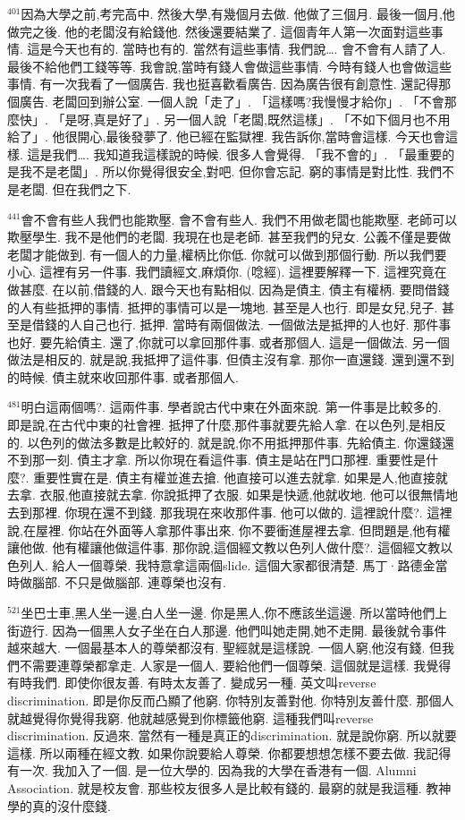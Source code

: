 \documentclass{book}
\begin{document}
$^{401}$因為大學之前,考完高中.
然後大學,有幾個月去做.
他做了三個月.
最後一個月,他做完之後.
他的老闆沒有給錢他.
然後還要結業了.
這個青年人第一次面對這些事情.
這是今天也有的.
當時也有的.
當然有這些事情.
我們說….
會不會有人請了人.
最後不給他們工錢等等.
我會說,當時有錢人會做這些事情.
今時有錢人也會做這些事情.
有一次我看了一個廣告.
我也挺喜歡看廣告.
因為廣告很有創意性.
還記得那個廣告.
老闆回到辦公室.
一個人說「走了」.
「這樣嗎?我慢慢才給你」.
「不會那麼快」.
「是呀,真是好了」.
另一個人說「老闆,既然這樣」.
「不如下個月也不用給了」.
他很開心,最後發夢了.
他已經在監獄裡.
我告訴你,當時會這樣.
今天也會這樣.
這是我們….
我知道我這樣說的時候.
很多人會覺得.
「我不會的」.
「最重要的是我不是老闆」.
所以你覺得很安全,對吧.
但你會忘記.
窮的事情是對比性.
我們不是老闆.
但在我們之下.

$^{441}$會不會有些人我們也能欺壓.
會不會有些人.
我們不用做老闆也能欺壓.
老師可以欺壓學生.
我不是他們的老闆.
我現在也是老師.
甚至我們的兒女.
公義不僅是要做老闆才能做到.
有一個人的力量,權柄比你低.
你就可以做到那個行動.
所以我們要小心.
這裡有另一件事.
我們讀經文,麻煩你.
(唸經).
這裡要解釋一下.
這裡究竟在做甚麼.
在以前,借錢的人.
跟今天也有點相似.
因為是債主.
債主有權柄.
要問借錢的人有些抵押的事情.
抵押的事情可以是一塊地.
甚至是人也行.
即是女兒,兒子.
甚至是借錢的人自己也行.
抵押.
當時有兩個做法.
一個做法是抵押的人也好.
那件事也好.
要先給債主.
還了,你就可以拿回那件事.
或者那個人.
這是一個做法.
另一個做法是相反的.
就是說,我抵押了這件事.
但債主沒有拿.
那你一直還錢.
還到還不到的時候.
債主就來收回那件事.
或者那個人.

$^{481}$明白這兩個嗎?.
這兩件事.
學者說古代中東在外面來說.
第一件事是比較多的.
即是說,在古代中東的社會裡.
抵押了什麼,那件事就要先給人拿.
在以色列,是相反的.
以色列的做法多數是比較好的.
就是說,你不用抵押那件事.
先給債主.
你還錢還不到那一刻.
債主才拿.
所以你現在看這件事.
債主是站在門口那裡.
重要性是什麼?.
重要性實在是.
債主有權並進去搶.
他直接可以進去就拿.
如果是人,他直接就去拿.
衣服,他直接就去拿.
你說抵押了衣服.
如果是快遞,他就收地.
他可以很無情地去到那裡.
你現在還不到錢.
那我現在來收那件事.
他可以做的.
這裡說什麼?.
這裡說,在屋裡.
你站在外面等人拿那件事出來.
你不要衝進屋裡去拿.
但問題是,他有權讓他做.
他有權讓他做這件事.
那你說,這個經文教以色列人做什麼?.
這個經文教以色列人.
給人一個尊榮.
我特意拿這兩個slide.
這個大家都很清楚.
馬丁·路德金當時做腦部.
不只是做腦部.
連尊榮也沒有.

$^{521}$坐巴士車,黑人坐一邊,白人坐一邊.
你是黑人,你不應該坐這邊.
所以當時他們上街遊行.
因為一個黑人女子坐在白人那邊.
他們叫她走開,她不走開.
最後就令事件越來越大.
一個最基本人的尊榮都沒有.
聖經就是這樣說.
一個人窮,他沒有錢.
但我們不需要連尊榮都拿走.
人家是一個人.
要給他們一個尊榮.
這個就是這樣.
我覺得有時我們.
即使你很友善.
有時太友善了.
變成另一種.
英文叫reverse discrimination.
即是你反而凸顯了他窮.
你特別友善對他.
你特別友善什麼.
那個人就越覺得你覺得我窮.
他就越感覺到你標籤他窮.
這種我們叫reverse discrimination.
反過來.
當然有一種是真正的discrimination.
就是說你窮.
所以就要這樣.
所以兩種在經文教.
如果你說要給人尊榮.
你都要想想怎樣不要去做.
我記得有一次.
我加入了一個.
是一位大學的.
因為我的大學在香港有一個.
Alumni Association.
就是校友會.
那些校友很多人是比較有錢的.
最窮的就是我這種.
教神學的真的沒什麼錢.
\end{document}
